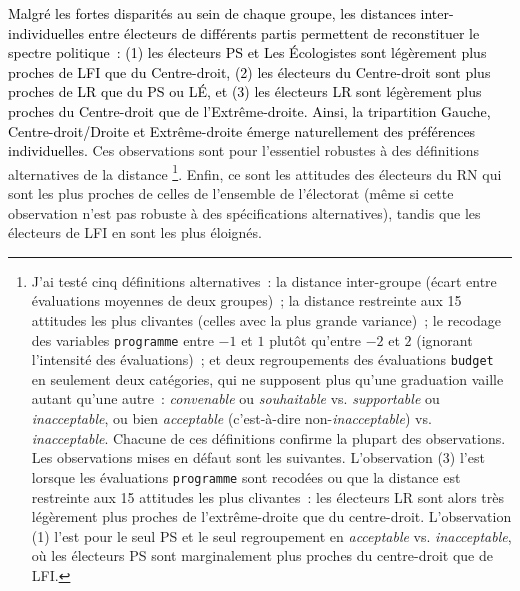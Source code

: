 \documentclass[12pt,french]{article}
\newcommand{\blue}[1]{\textcolor{black}{#1}} %
\begin{document}
\blue{Malgré les fortes disparités au sein de chaque groupe, les distances inter-individuelles entre électeurs de différents partis permettent de reconstituer le spectre politique~: (1) les électeurs PS et Les Écologistes sont légèrement plus proches de LFI que du Centre-droit, (2) les électeurs du Centre-droit sont plus proches de LR que du PS ou LÉ, et (3) les électeurs LR sont légèrement plus proches du Centre-droit que de l'Extrême-droite. Ainsi, la tripartition Gauche, Centre-droit/Droite et Extrême-droite émerge naturellement des préférences individuelles.} Ces observations sont pour l'essentiel robustes à des définitions alternatives de la distance%
\footnote{J'ai testé cinq définitions alternatives~: la distance inter-groupe (écart entre évaluations moyennes de deux groupes)~; la distance restreinte aux 15 attitudes les plus clivantes (celles avec la plus grande variance)~; le recodage des variables \texttt{programme} entre $-1$ et $1$ plutôt qu'entre $-2$ et $2$ (ignorant l'intensité des évaluations)~; et deux regroupements des évaluations \texttt{budget} en seulement deux catégories, qui ne supposent plus qu'une graduation vaille autant qu'une autre~: \textit{convenable} ou \textit{souhaitable} vs. \textit{supportable} ou \textit{inacceptable}, ou bien \textit{acceptable} (c'est-à-dire non-\textit{inacceptable}) vs. \textit{inacceptable}. Chacune de ces définitions confirme la plupart des observations. %
Les observations mises en défaut sont les suivantes. L'observation (3) l'est lorsque les évaluations \texttt{programme} sont recodées ou que la distance est restreinte aux 15 attitudes les plus clivantes~: les électeurs LR sont alors très légèrement plus proches de l'extrême-droite que du centre-droit. %
L'observation (1) l'est pour le seul PS et le seul regroupement en \textit{acceptable} vs. \textit{inacceptable}, où les électeurs PS sont marginalement plus proches du centre-droit que de LFI. %
}. Enfin, ce sont les attitudes des électeurs du RN qui sont les plus proches de celles de l'ensemble de l'électorat (même si cette observation n'est pas robuste à des spécifications alternatives), %
tandis que les électeurs de LFI en sont les plus éloignés. 
\end{document}
